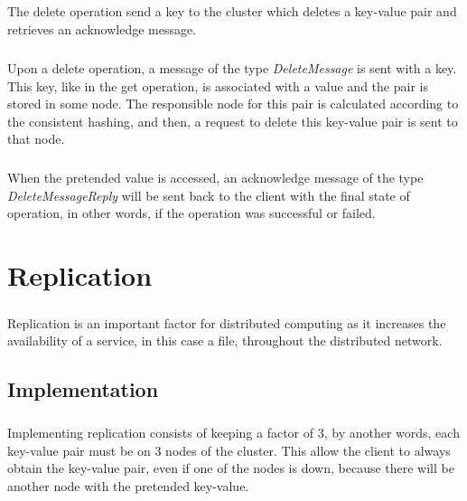 \documentclass{report}
\begin{document}
					\paragraph{} The delete operation send a key to the cluster which deletes
					a key-value pair and retrieves an acknowledge message.

					\paragraph{} Upon a delete operation, a message of the type \emph{DeleteMessage}
					is sent with a key. This key, like in the get operation, is associated 
					with a value and the pair is stored in some node. 
					The responsible node for this pair is calculated
					according to the consistent hashing, and then, a request to delete this
					key-value pair is sent to that node.

					\paragraph{} When the pretended value is accessed, an acknowledge message of 
					the type \emph{DeleteMessageReply} will be sent back to the client with 
					the final state of operation, in other words, if the operation was 
					successful or failed.
	
	\chapter{Replication}
	
	        \paragraph{} Replication is an important factor for distributed computing
			as it increases the availability of a service, in this case a file,
			throughout the distributed network.
	        
			\section{Implementation}
	
				\paragraph{} Implementing replication consists of keeping a factor 
				of 3, by another words, each key-value pair must be on 3 nodes of 
				the cluster. This allow the client to always obtain the key-value 
				pair, even if one of the nodes is down, because there will be another
				node with the pretended key-value. 
\end{document}
